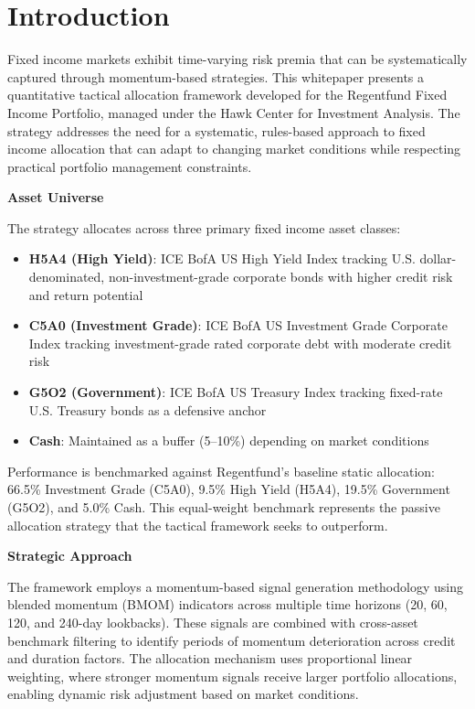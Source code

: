 \documentclass[11pt, letterpaper]{article}
\begin{document}
\newpage
\tableofcontents
\newpage

\section{Introduction}

Fixed income markets exhibit time-varying risk premia that can be systematically captured through momentum-based strategies. This whitepaper presents a quantitative tactical allocation framework developed for the Regentfund Fixed Income Portfolio, managed under the Hawk Center for Investment Analysis. The strategy addresses the need for a systematic, rules-based approach to fixed income allocation that can adapt to changing market conditions while respecting practical portfolio management constraints.

\textbf{Asset Universe}

The strategy allocates across three primary fixed income asset classes:
\begin{itemize}
    \item \textbf{H5A4 (High Yield)}: ICE BofA US High Yield Index tracking U.S. dollar-denominated, non-investment-grade corporate bonds with higher credit risk and return potential
    \item \textbf{C5A0 (Investment Grade)}: ICE BofA US Investment Grade Corporate Index tracking investment-grade rated corporate debt with moderate credit risk
    \item \textbf{G5O2 (Government)}: ICE BofA US Treasury Index tracking fixed-rate U.S. Treasury bonds as a defensive anchor
    \item \textbf{Cash}: Maintained as a buffer (5--10\%) depending on market conditions
\end{itemize}

Performance is benchmarked against Regentfund's baseline static allocation: 66.5\% Investment Grade (C5A0), 9.5\% High Yield (H5A4), 19.5\% Government (G5O2), and 5.0\% Cash. This equal-weight benchmark represents the passive allocation strategy that the tactical framework seeks to outperform.

\textbf{Strategic Approach}

The framework employs a momentum-based signal generation methodology using blended momentum (BMOM) indicators across multiple time horizons (20, 60, 120, and 240-day lookbacks). These signals are combined with cross-asset benchmark filtering to identify periods of momentum deterioration across credit and duration factors. The allocation mechanism uses proportional linear weighting, where stronger momentum signals receive larger portfolio allocations, enabling dynamic risk adjustment based on market conditions.
\end{document}
